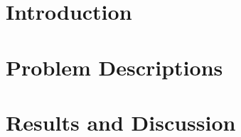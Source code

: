 \documentclass[titlepage, a4paper, 11pt]{article}
\begin{document}


\tableofcontents
\newpage
\listoffigures
\listoftables
\newpage

\section{Introduction}



\newpage

\section{Problem Descriptions}











\section{Results and Discussion}






\printbibliography
\end{document}
